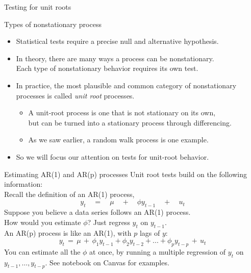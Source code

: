 \documentclass[t,12pt]{beamer}
\begin{document}
\begin{frame}[c]
\vfill
\centerline{Testing for unit roots}
\vfill
\end{frame}

\begin{frame}[c]{Types of nonstationary process}
\begin{itemize}
\item Statistical tests require a precise null and alternative hypothesis.
\medskip
\item In theory, there are many ways a process can be nonstationary.
\\ Each type of nonstationary behavior requires its own test.
\medskip
\item
In practice, the most plausible and common category of nonstationary processes is called \emph{unit root} processes.
\medskip
\begin{itemize}
\item
A unit-root process is one that is not stationary on its own,
\\ but can be turned into a stationary process through differencing.
\item As we saw earlier, a random walk process is one example.
\end{itemize}
\medskip
\item So we will focus our attention on tests for unit-root behavior.
\end{itemize}
\end{frame}

\begin{frame}[c]{Estimating AR(1) and AR(p) processes}
Unit root tests build on the following information:
\\ \bigskip
Recall the definition of an AR(1) process,
$$
y_t \quad = \quad \mu \quad + \quad \phi y_{t-1} \quad + \quad u_t
$$
Suppose you believe a data series follows an AR(1) process. 
\\ How would you estimate $\phi$? Just regress $y_t$ on $y_{t-1}$.
\\ \bigskip
An AR(p) process is like an AR(1), with $p$ lags of $y$:
$$
y_t \, = \, \mu \, + \, \phi_1 y_{t-1} + \phi_2 y_{t-2} + ... + \phi_p y_{t-p} \, + \, u_t
$$
You can estimate all the $\phi$ at once, by running a multiple regression of $y_t$ on $y_{t-1},\dots,y_{t-p}$.
See notebook on Canvas for examples.
\end{frame}
\end{document}
